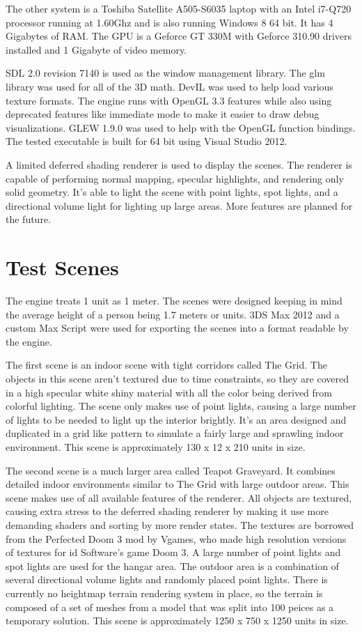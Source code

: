 \documentclass[12pt]{ucthesis}
\begin{document}
The other system is a Toshiba Satellite A505-S6035 laptop with an Intel i7-Q720 processor running at 1.60Ghz and is also running Windows 8 64 bit.
It has 4 Gigabytes of RAM.
The GPU is a Geforce GT 330M with Geforce 310.90 drivers installed and 1 Gigabyte of video memory.

SDL 2.0 revision 7140 is used as the window management library.
The glm library was used for all of the 3D math.
DevIL was used to help load various texture formats.
The engine runs with OpenGL 3.3 features while also using deprecated features like immediate mode to make it easier to draw debug visualizations.
GLEW 1.9.0 was used to help with the OpenGL function bindings.
The tested executable is built for 64 bit using Visual Studio 2012.

A limited deferred shading renderer is used to display the scenes.
The renderer is capable of performing normal mapping, specular highlights, and rendering only solid geometry.
It's able to light the scene with point lights, spot lights, and a directional volume light for lighting up large areas.
More features are planned for the future.

\section{Test Scenes}
\label{test-scenes}

The engine treats 1 unit as 1 meter.
The scenes were designed keeping in mind the average height of a person being 1.7 meters or units.
3DS Max 2012 and a custom Max Script were used for exporting the scenes into a format readable by the engine.

The first scene is an indoor scene with tight corridors called The Grid.
The objects in this scene aren't textured due to time constraints, so they are covered in a high specular white shiny material with all the color being derived from colorful lighting.
The scene only makes use of point lights, causing a large number of lights to be needed to light up the interior brightly.
It's an area designed and duplicated in a grid like pattern to simulate a fairly large and sprawling indoor environment.
This scene is approximately 130 x 12 x 210 units in size.

The second scene is a much larger area called Teapot Graveyard.
It combines detailed indoor environments similar to The Grid with large outdoor areas.
This scene makes use of all available features of the renderer.
All objects are textured, causing extra stress to the deferred shading renderer by making it use more demanding shaders and sorting by more render states.
The textures are borrowed from the Perfected Doom 3 mod by Vgames, who made high resolution versions of textures for id Software's game Doom 3.\cite{Perf-Doom3}
A large number of point lights and spot lights are used for the hangar area.
The outdoor area is a combination of several directional volume lights and randomly placed point lights.
There is currently no heightmap terrain rendering system in place, so the terrain is composed of a set of meshes from a model that was split into 100 peices as a temporary solution.
This scene is approximately 1250 x 750 x 1250 units in size.
\end{document}
